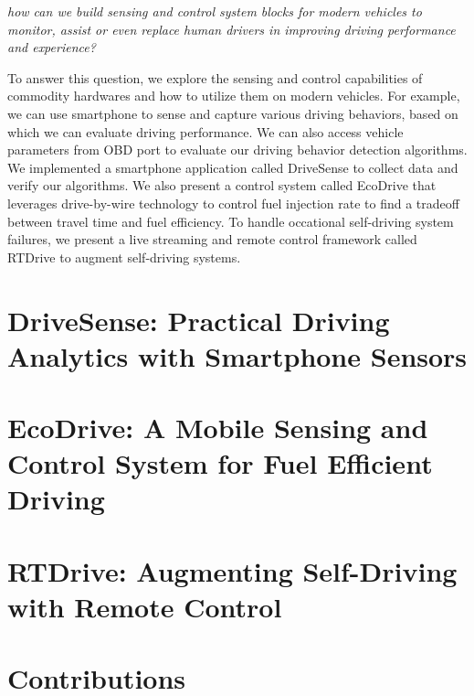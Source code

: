 \emph{how can we build sensing and control system blocks for modern vehicles to
monitor, assist or even replace human drivers in
improving driving performance and experience?}


To answer this question, we explore the sensing and control capabilities
of commodity hardwares and how to utilize them on modern vehicles. 
For example, we can use smartphone to sense and capture 
various driving behaviors, 
based on which we can evaluate driving performance. 
We can also access vehicle parameters from OBD 
port \cite{obd} to evaluate our driving behavior detection algorithms. 
We implemented a smartphone application called DriveSense to collect
data and verify our algorithms. 
We also present a control system called EcoDrive that 
leverages drive-by-wire technology to control fuel injection
rate to find a tradeoff between travel time and fuel efficiency. 
To handle occational self-driving system failures, 
we present a live streaming and remote control framework
called RTDrive to augment self-driving systems. 


\section{DriveSense: Practical Driving Analytics with Smartphone Sensors}




\section{EcoDrive: A Mobile Sensing and Control System for Fuel Efficient Driving}




\section{RTDrive: Augmenting Self-Driving with Remote Control}



\section{Contributions}


